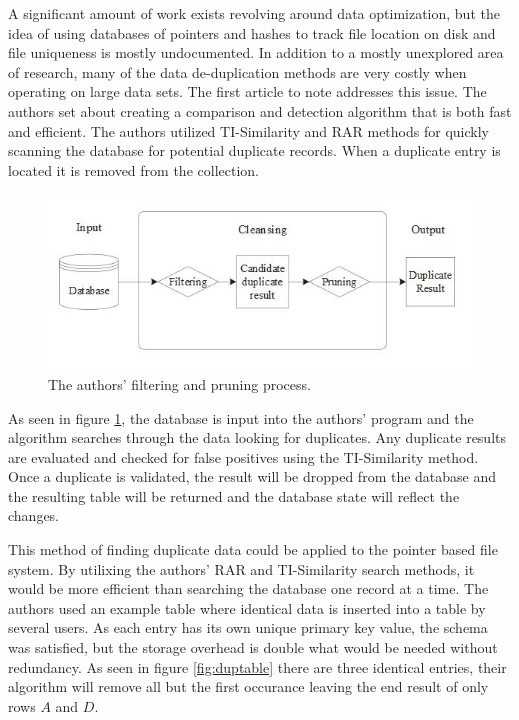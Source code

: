\documentclass[11pt]{article}
\begin{document}
A significant amount of work exists revolving around data optimization, but the idea of using databases of pointers and hashes to track file location on disk and file uniqueness is mostly undocumented. In addition to a mostly unexplored area of research, many of the data de-duplication methods are very costly when operating on large data sets. The first article to note addresses this issue. The authors set about creating a comparison and detection algorithm that is both fast and efficient. The authors utilized TI-Similarity and RAR methods for quickly scanning the database for potential duplicate records. \cite{Sung:2002:FFS:584792.584808} When a duplicate entry is located it is removed from the collection.

\begin{figure}
\begin{center}
\includegraphics[scale=.8]{duplicate}
\caption{\label{fig:duplicate} The authors' filtering and pruning process.}
\end{center}
\end{figure}

As seen in figure \ref{fig:duplicate}, the database is input into the authors' program and the algorithm searches through the data looking for duplicates. Any duplicate results are evaluated and checked for false positives using the TI-Similarity method. \cite{Sung:2002:FFS:584792.584808} Once a duplicate is validated, the result will be dropped from the database  and the resulting table will be returned and the database state will reflect the changes.

This method of finding duplicate data could be applied to the pointer based file system. By utilixing the authors' RAR and TI-Similarity search methods, it would be more efficient than searching the database one record at a time. The authors used an example table where identical data is inserted into a table by several users. As each entry has its own unique primary key value, the schema was satisfied, but the storage overhead is double what would be needed without redundancy. As seen in figure \ref{fig:duptable} there are three identical entries, their algorithm will remove all but the first occurance leaving the end result of only rows $A$ and $D$.
\end{document}
